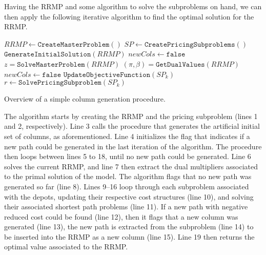 \documentclass{article}
\begin{document}
\vspace{12pt}

Having the RRMP and some algorithm to solve the subproblems on hand, we can then apply the following iterative algorithm to find the optimal solution for the RRMP.

\begin{algorithm}
   $\mathit{RRMP} \gets \mathtt{CreateMasterProblem()}$\;
   $\mathit{SP} \gets \mathtt{CreatePricingSubproblems}()$\;
   $\mathtt{GenerateInitialSolution}(\mathit{RRMP})$\;
   $\mathit{newCols} \gets \mathtt{false}$\;
    {
      $z = \mathtt{SolveMasterProblem}(\mathit{RRMP})$\;
      $(\pi, \beta) = \mathtt{GetDualValues}(\mathit{RRMP})$\;
      $\mathit{newCols} \gets \mathtt{false}$\;
       {
         $\mathtt{UpdateObjectiveFunction}(\mathit{SP}_k)$\;
         $r \gets \mathtt{SolvePricingSubproblem}(\mathit{SP}_k)$\;
      }
   }
   \caption{Overview of a simple column generation procedure.}
\end{algorithm}

The algorithm starts by creating the RRMP and the pricing subproblem (lines 1 and 2, respectively). Line 3 calls the procedure that generates the artificial initial set of columns, as aforementioned. Line 4 initializes the flag that indicates if a new path could be generated in the last iteration of the algorithm. The procedure then loops between lines 5 to 18, until no new path could be generated. Line 6 solves the current RRMP, and line 7 then extract the dual multipliers associated to the primal solution of the model. The algorithm flags that no new path was generated so far (line 8). Lines 9--16 loop through each subproblem associated with the depots, updating their respective cost structures (line 10), and solving their associated shortest path problems (line 11). If a new path with negative reduced cost could be found (line 12), then it flags that a new column was generated (line 13), the new path is extracted from the subproblem (line 14) to be inserted into the RRMP as a new column (line 15). Line 19 then returns the optimal value associated to the RRMP.
\end{document}
